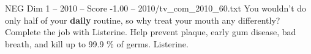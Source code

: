 \begin{textsample}{NEG Dim 1 – 2010 – Score -1.00 – 2010/tv\_com\_2010\_60.txt}  \label{ex:f1_neg_036}
You wouldn't do only half of your \textbf{daily} routine, so why treat your mouth any differently?
Complete the job with Listerine.
Help prevent plaque, early gum disease, bad breath, and kill up to 99.9 \% of germs.
Listerine.

\end{textsample}
